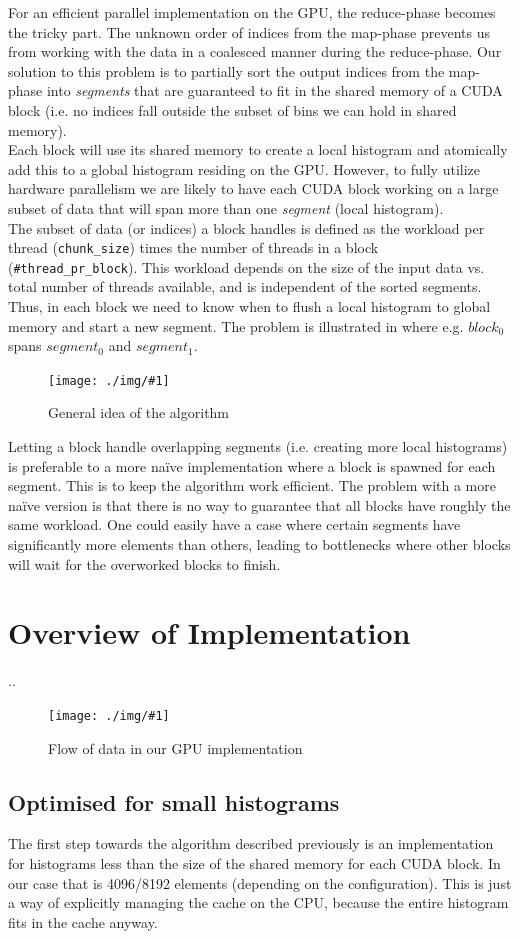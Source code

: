 \documentclass[12pt, a4paper, hidelinks]{article}
\newcommand{\fig}[3]{
\begin{figure}[h]
  \begin{center}
    \texttt{[image: ./img/\#1]}
  \end{center}
  \caption{#3}
  \label{fig:#1}
\end{figure}
}
\renewcommand{\tt}[1]{\texttt{#1}}
\renewcommand{\it}[1]{\textit{#1}}
\begin{document}
For an efficient parallel implementation on the GPU,
the reduce-phase becomes the tricky part.
The unknown order of indices from the map-phase
prevents us from working with the data in a coalesced manner during the reduce-phase.
Our solution to this problem is to partially sort the output indices from
the map-phase into \it{segments} that are guaranteed to fit in the
shared memory of a CUDA block (i.e. no indices fall outside the subset of bins
we can hold in shared memory).\\
Each block will use its shared memory to create a local histogram
and atomically add this to a global histogram residing on the GPU.
However, to fully utilize hardware parallelism we are likely to have
each CUDA block working on a large subset of data that will
span more than one \it{segment} (local histogram).\\
The subset of data (or indices) a block handles is defined as the workload per thread
(\tt{chunk\_size}) times the number of threads in a block (\tt{\#thread\_pr\_block}).
This workload depends on the size of the input data vs.
total number of threads available, and is independent of the sorted segments.
Thus, in each block we need to know when to flush a local histogram to global
memory and start a new segment.
The problem is illustrated in  where e.g.
$block_0$ spans $segment_0$ and $segment_1$.

\fig{overview}{140}{General idea of the algorithm}

Letting a block handle overlapping segments (i.e. creating more local histograms)
is preferable to a more naïve implementation where a block is spawned
for each segment. This is to keep the algorithm work efficient.
The problem with a more naïve version is that there is no way
to guarantee that all blocks have roughly the same workload.
One could easily have a case where certain segments have significantly
more elements than others, leading to bottlenecks where other blocks will
wait for the overworked blocks to finish.

\section{Overview of Implementation}
..

\fig{device-dia}{140}{Flow of data in our GPU implementation}

\subsection{Optimised for small histograms}
The first step towards the algorithm described previously is an implementation
for histograms less than the size of the shared memory for each CUDA block.
In our case that is 4096/8192 elements (depending on the configuration).
This is just a way of explicitly managing the cache on the CPU, because the
entire histogram fits in the cache anyway.
\end{document}
